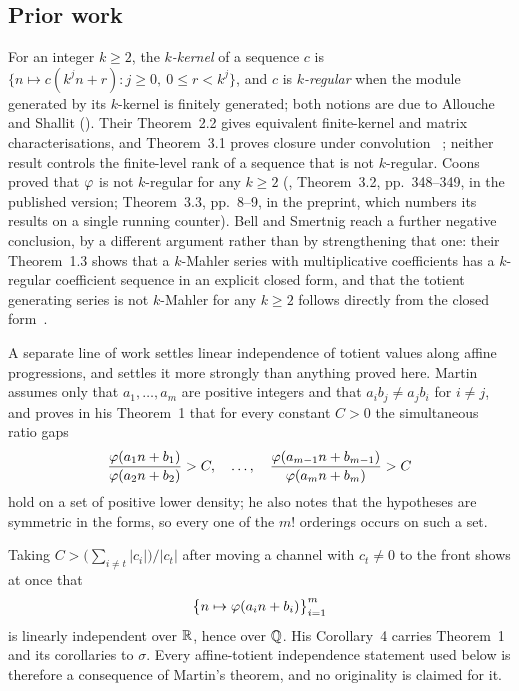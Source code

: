 \documentclass[11pt]{article}
\begin{document}
\subsection{Prior work}

For an integer $k\ge2$, the \emph{$k$-kernel} of a sequence $c$ is
$\{n\mapsto c(k^jn+r):j\ge0,\ 0\le r<k^j\}$, and $c$ is \emph{$k$-regular}
when the module generated by its $k$-kernel is finitely generated; both
notions are due to Allouche and Shallit
(\cite[Defs.~1.1 and 2.1, author-preprint pp.~2--3]{allouche-shallit}).
Their Theorem~2.2 gives equivalent finite-kernel and matrix
characterisations, and Theorem~3.1 proves closure under convolution
~\cite[pp.~3--4 and 10--11]{allouche-shallit}; neither result controls the
finite-level rank of a sequence that is not $k$-regular.  Coons proved that
$\varphi$ is not $k$-regular for any $k\ge2$ (\cite{coons}, Theorem~3.2,
pp.~348--349, in the published version; Theorem~3.3, pp.~8--9, in the
preprint, which numbers its results on a single running counter).  Bell and
Smertnig reach a further negative
conclusion, by a different argument rather than by strengthening that one:
their Theorem~1.3 shows that a $k$-Mahler series with multiplicative
coefficients has a $k$-regular coefficient sequence in an explicit closed form,
and that the totient generating series is not $k$-Mahler for any $k\ge2$
follows directly from the closed form~\cite{bell-smertnig}.

A separate line of work settles linear independence of totient values along
affine progressions, and settles it more strongly than anything proved here.
Martin~\cite{martin-phi-inequalities} assumes only that $a_1,\dots,a_m$ are
positive integers and that $a_ib_j\neq a_jb_i$ for $i\neq j$, and proves in his
Theorem~1 that for every constant $C>0$ the simultaneous ratio gaps
\[
 \frac{\varphi(a_1n+b_1)}{\varphi(a_2n+b_2)}>C,\quad\dots,\quad
 \frac{\varphi(a_{m-1}n+b_{m-1})}{\varphi(a_mn+b_m)}>C
\]
hold on a set of positive lower density; he also notes that the hypotheses are
symmetric in the forms, so every one of the $m!$ orderings occurs on such a set.

Taking $C>\bigl(\sum_{i\neq t}|c_i|\bigr)/|c_t|$ after moving a channel with
$c_t\neq0$ to the front shows at once that
\[
 \bigl\{n\mapsto\varphi(a_in+b_i)\bigr\}_{i=1}^m
\]
is linearly independent over $\mathbb{R}$, hence over $\mathbb{Q}$.  His Corollary~4 carries
Theorem~1 and its corollaries to $\sigma$.  Every affine-totient independence
statement used below is therefore a consequence of Martin's theorem, and no
originality is claimed for it.
\end{document}
